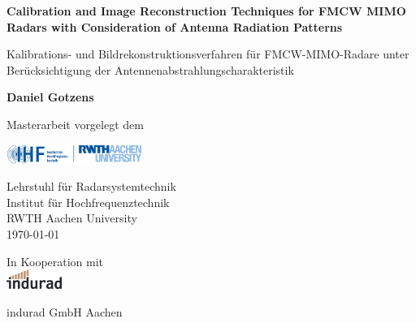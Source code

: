 \begin{titlepage}
    \begin{center}
        \vspace*{1cm}

        \huge
        \textbf{Calibration and Image Reconstruction Techniques
            for FMCW MIMO Radars with Consideration of Antenna Radiation Patterns}
        \vspace{0.5cm}

        \large
        Kalibrations- und Bildrekonstruktionsverfahren für FMCW-MIMO-Radare unter Berücksichtigung der Antennenabstrahlungscharakteristik
        \vspace{1.5cm}

        \textbf{Daniel Gotzens}

        \vfill

        \normalsize
        Masterarbeit vorgelegt dem \\

        \vspace{0.8cm}

        \includegraphics[height=18pt]{../figures/IHF-Logo_platzhalter.png}

        Lehrstuhl für Radarsystemtechnik \\
        Institut für Hochfrequenztechnik \\
        RWTH Aachen University\\
        \today

        \vspace{1cm}
        In Kooperation mit \\

        \includegraphics[height=18pt]{../figures/indurad-logo.png}

        indurad GmbH
        Aachen

    \end{center}
\end{titlepage}

\begin{abstract}

\end{abstract}